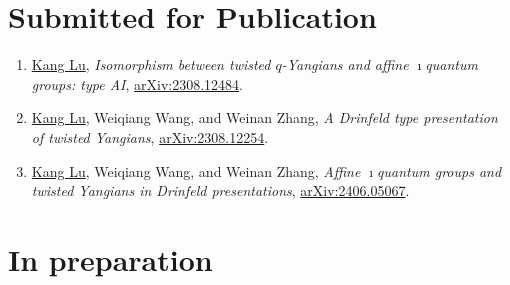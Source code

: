 \documentclass[11pt,letterpaper,roman%
]{moderncv}
\begin{document}
\section{Submitted for Publication}

\begin{enumerate}[leftmargin=1.17cm]
\item \underline{Kang Lu}, {\textit{Isomorphism between twisted $q$-Yangians and affine $\imath$quantum groups: type AI}}, \href{https://arxiv.org/abs/2308.12484}{arXiv:2308.12484}. 

\item \underline{Kang Lu}, Weiqiang Wang, and Weinan Zhang, {\textit{A Drinfeld type presentation of twisted Yangians}}, \href{https://arxiv.org/abs/2308.12254}{arXiv:2308.12254}. 

\item \underline{Kang Lu}, Weiqiang Wang, and Weinan Zhang, {\textit{Affine 
$\imath$quantum groups and twisted Yangians in Drinfeld presentations}}, \href{https://arxiv.org/abs/2406.05067}{arXiv:2406.05067}.




\end{enumerate}

\section{In preparation}
\end{document}
